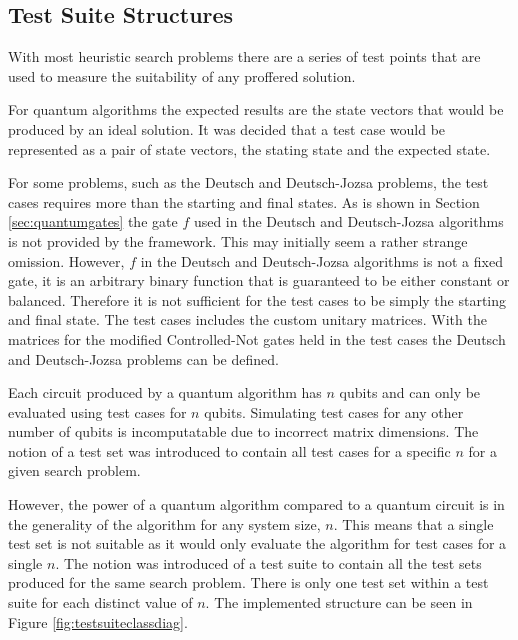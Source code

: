 \subsection{Test Suite Structures}
\label{sec:testsuitestruc}
With most heuristic search problems there are a series of test points that are used to measure the suitability of any proffered solution.

For quantum algorithms the expected results are the state vectors that would be produced by an ideal solution.
It was decided that a test case would be represented as a pair of state vectors, the stating state and the expected state.

For some problems, such as the Deutsch and Deutsch-Jozsa problems, the test cases requires more than the starting and final states.
As is shown in Section \ref{sec:quantumgates} the gate $f$ used in the Deutsch and Deutsch-Jozsa algorithms is not provided by the framework.
This may initially seem a rather strange omission.
However, $f$ in the Deutsch and Deutsch-Jozsa algorithms is not a fixed gate, it is an arbitrary binary function that is guaranteed to be either constant or balanced.
Therefore it is not sufficient for the test cases to be simply the starting and final state.
The test cases includes the custom unitary matrices.
With the matrices for the modified Controlled-Not gates held in the test cases the Deutsch and Deutsch-Jozsa problems can be defined.

Each circuit produced by a quantum algorithm has $n$ qubits and can only be evaluated using test cases for $n$ qubits.
Simulating test cases for any other number of qubits is incomputatable due to incorrect matrix dimensions.
The notion of a test set was introduced to contain all test cases for a specific $n$ for a given search problem.

However, the power of a quantum algorithm compared to a quantum circuit is in the generality of the algorithm for any system size, $n$.
This means that a single test set is not suitable as it would only evaluate the algorithm for test cases for a single $n$.
The notion was introduced of a test suite to contain all the test sets produced for the same search problem.
There is only one test set within a test suite for each distinct value of $n$.
The implemented structure can be seen in Figure \ref{fig:testsuiteclassdiag}.

